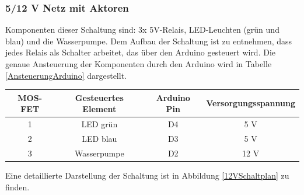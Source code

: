 \subsubsection{5/12 V Netz mit Aktoren}
Komponenten dieser Schaltung sind: 3x 5V-Relais, LED-Leuchten (grün und blau) und die Wasserpumpe. Dem Aufbau der Schaltung ist zu entnehmen, dass jedes Relais als Schalter arbeitet, das über den Arduino gesteuert wird. Die genaue Ansteuerung der Komponenten durch den Arduino wird in Tabelle \ref{AnsteuerungArduino} dargestellt.
	\begin{center}
	\begin{tabular}{c|c|c|c}
		MOS-FET & Gesteuertes Element & Arduino Pin & Versorgungsspannung\\ \hline
		 1 & LED grün & D4 & 5 V\\
	     2 & LED blau & D3 & 5 V\\
	     3 & Wasserpumpe & D2 & 12 V\\
	\end{tabular}
	\label{AnsteuerungArduino}
\end{center}
Eine detaillierte Darstellung der Schaltung ist in Abbildung \ref{12VSchaltplan} zu finden.
